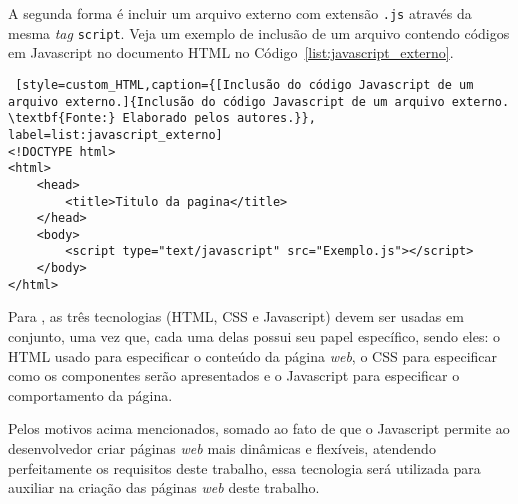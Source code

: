 
A segunda forma é incluir um arquivo externo com extensão \texttt{.js} através da mesma \textit{tag} \texttt{script}. Veja um exemplo de inclusão de um arquivo contendo códigos em Javascript no documento HTML no Código~\ref{list:javascript_externo}.

\begin{lstlisting} [style=custom_HTML,caption={[Inclusão do código Javascript de um arquivo externo.]{Inclusão do código Javascript de um arquivo externo. \textbf{Fonte:} Elaborado pelos autores.}}, label=list:javascript_externo] 	
<!DOCTYPE html>
<html>
	<head>
		<title>Titulo da pagina</title>
	</head>
	<body>
		<script type="text/javascript" src="Exemplo.js"></script>
	</body>
</html>
\end{lstlisting}


Para , as três tecnologias (HTML, CSS e Javascript) devem ser usadas em conjunto, uma vez que, cada uma delas possui seu papel específico, sendo eles: o HTML usado para especificar o conteúdo da página \textit{web}, o CSS para especificar como os componentes serão apresentados e o Javascript para especificar o comportamento da página.

Pelos motivos acima mencionados, somado ao fato de que o Javascript permite ao desenvolvedor criar páginas \textit{web} mais dinâmicas e flexíveis, atendendo perfeitamente os requisitos deste trabalho, essa tecnologia será utilizada para auxiliar na criação das páginas \textit{web} deste trabalho.